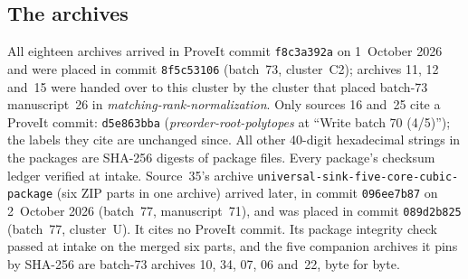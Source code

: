 \documentclass[11pt]{article}
\numberwithin{equation}{section}
\theoremstyle{definition}\newtheorem{definition}[theorem]{Definition}\newtheorem{remark}[theorem]{Remark}
\newcommand{\prp}{\emph{preorder-root-polytopes}}
\newcommand{\mrn}{\emph{matching-rank-normalization}}
\begin{document}
\subsection{The archives}\label{pgr:sec:prov:archives}
All eighteen archives arrived in ProveIt commit \nolinkurl{f8c3a392a} on
1~October 2026 and were placed in commit \nolinkurl{8f5c53106} (batch~73,
cluster~C2); archives 11, 12 and~15 were handed over to this cluster by the
cluster that placed batch-73 manuscript~26 in \mrn. Only sources 16 and~25
cite a ProveIt commit: \nolinkurl{d5e863bba} (\prp{} at ``Write batch 70
(4/5)''); the labels they cite are unchanged since. All other 40-digit
hexadecimal strings in the packages are SHA-256 digests of package files.
Every package's checksum ledger verified at intake.
Source~35's archive \nolinkurl{universal-sink-five-core-cubic-package}
(six ZIP parts in one archive) arrived later, in commit
\nolinkurl{096ee7b87} on 2~October 2026 (batch~77, manuscript~71), and
was placed in commit \nolinkurl{089d2b825} (batch~77, cluster~U). It
cites no ProveIt commit. Its package integrity check passed at intake on
the merged six parts, and the five companion archives it pins by SHA-256
are batch-73 archives 10, 34, 07, 06 and~22, byte for byte.
\end{document}

